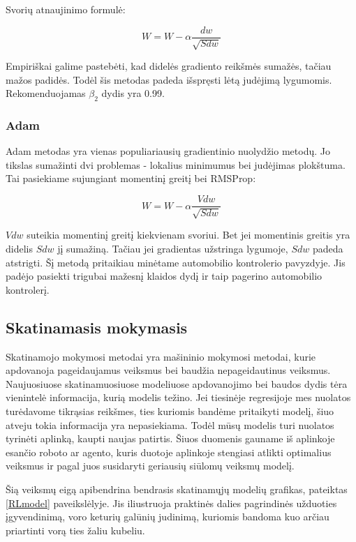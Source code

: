 \documentclass[a4paper, 12pt]{article}
\begin{document}
Svorių atnaujinimo formulė:

\begin{equation}
W=W-\alpha \frac{d w}{\sqrt{S d w}}
\end{equation}

Empiriškai galime pastebėti, kad didelės gradiento reikšmės sumažės, tačiau mažos padidės. Todėl šis metodas padeda išspręsti lėtą judėjimą lygumomis. Rekomenduojamas $\beta_2$ dydis yra 0.99.

%
\subsubsection{Adam}
%

Adam\cite{Adam} metodas yra vienas populiariausių gradientinio nuolydžio metodų. Jo tikslas sumažinti dvi problemas - lokalius minimumus bei judėjimas plokštuma. Tai pasiekiame sujungiant momentinį greitį bei RMSProp:

\begin{equation}
W=W-\alpha \frac{V d w}{\sqrt{S d w}}
\end{equation}

$Vdw$ suteikia momentinį greitį kiekvienam svoriui. Bet jei momentinis greitis yra didelis $Sdw$ jį sumažiną. Tačiau jei gradientas užstringa lygumoje, $Sdw$ padeda atstrigti.
Šį metodą pritaikiau minėtame automobilio kontrolerio pavyzdyje. Jis padėjo pasiekti trigubai mažesnį klaidos dydį ir taip pagerino automobilio kontrolerį.


%
\subsection{Skatinamasis mokymasis}
%

Skatinamojo mokymosi metodai yra mašininio mokymosi metodai, kurie apdovanoja pageidaujamus veiksmus bei baudžia nepageidautinus veiksmus. Naujuosiuose skatinamuosiuose modeliuose apdovanojimo bei baudos dydis tėra vienintelė informacija, kurią modelis težino. Jei tiesinėje regresijoje mes nuolatos turėdavome tikrąsias reikšmes, ties kuriomis bandėme pritaikyti modelį, šiuo atveju tokia informacija yra nepasiekiama. Todėl mūsų modelis turi nuolatos tyrinėti aplinką, kaupti naujas patirtis. Šiuos duomenis gauname iš aplinkoje esančio roboto ar agento, kuris duotoje aplinkoje stengiasi atlikti optimalius veiksmus ir pagal juos susidaryti geriausių siūlomų veiksmų modelį. 

Šią veiksmų eigą apibendrina bendrasis skatinamųjų modelių grafikas, pateiktas \ref{RLmodel} paveikslėlyje. Jis iliustruoja praktinės dalies pagrindinės užduoties įgyvendinimą, voro keturių galūnių judinimą, kuriomis bandoma kuo arčiau priartinti vorą ties žaliu kubeliu. 
\end{document}
